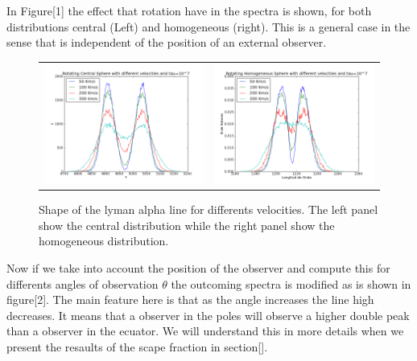 \documentclass{article}
\theoremstyle{definition}
\theoremstyle{remark}
\begin{document}
In Figure[1] the effect that rotation have in the spectra is shown,
for both distributions central (Left) and homogeneous (right). This is
a general case in the sense that is independent of the position of an
external observer.  

\begin{figure}[H]

  \centering

  \label{HOMandCentral}\caption{Shape of the lyman alpha line for
    differents velocities. The left panel show the central
    distribution while the right panel show the homogeneous
    distribution. } 

  \begin{tabular}{cc}    
    \includegraphics[width=60mm]{7tDifSpeedsZ.png}&
    \includegraphics[width=60mm]{7tHOMDifSpeeds1.png}\\
  \end{tabular}

\end{figure}
Now if we take into account the position of the observer and compute
this for differents angles of observation $\theta$ the outcoming
spectra is modified as is shown in figure[2]. The main feature here is
that as the angle increases the line high decreases. It means that a
observer in the poles will observe a higher double peak than a
observer in the ecuator. We will understand this in more details when
we present the resaults of the scape fraction in section[].      
\end{document}
